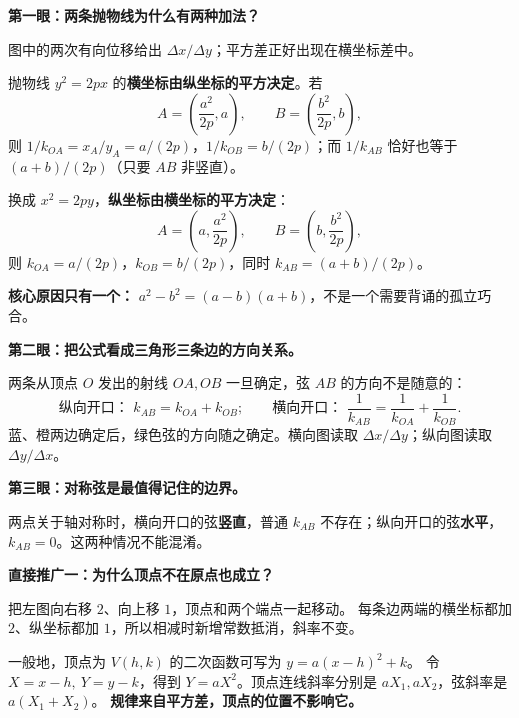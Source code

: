 \clearpage
\begin{explanationbox}
\textbf{第一眼：两条抛物线为什么有两种加法？}
\begin{center}\end{center}
图中的两次有向位移给出 $\Delta x/\Delta y$；平方差正好出现在横坐标差中。

抛物线 $y^2=2px$ 的\textbf{横坐标由纵坐标的平方决定}。若
\[
A=\left(\frac{a^2}{2p},a\right),\qquad
B=\left(\frac{b^2}{2p},b\right),
\]
则 $1/k_{OA}=x_A/y_A=a/(2p)$，$1/k_{OB}=b/(2p)$；而 $1/k_{AB}$ 恰好也等于 $(a+b)/(2p)$（只要 $AB$ 非竖直）。

换成 $x^2=2py$，\textbf{纵坐标由横坐标的平方决定}：
\[
A=\left(a,\frac{a^2}{2p}\right),\qquad
B=\left(b,\frac{b^2}{2p}\right),
\]
则 $k_{OA}=a/(2p)$，$k_{OB}=b/(2p)$，同时 $k_{AB}=(a+b)/(2p)$。

\textbf{核心原因只有一个：} $a^2-b^2=(a-b)(a+b)$，不是一个需要背诵的孤立巧合。

\end{explanationbox}
\clearpage
\begin{explanationbox}
\textbf{第二眼：把公式看成三角形三条边的方向关系。}
\begin{center}\end{center}

两条从顶点 $O$ 发出的射线 $OA,OB$ 一旦确定，弦 $AB$ 的方向不是随意的：
\[
\text{纵向开口： }k_{AB}=k_{OA}+k_{OB};
\qquad
\text{横向开口： }\frac1{k_{AB}}=\frac1{k_{OA}}+\frac1{k_{OB}}.
\]
蓝、橙两边确定后，绿色弦的方向随之确定。横向图读取 $\Delta x/\Delta y$；纵向图读取 $\Delta y/\Delta x$。

\end{explanationbox}
\clearpage
\begin{explanationbox}
\textbf{第三眼：对称弦是最值得记住的边界。}
\begin{center}

\end{center}
两点关于轴对称时，横向开口的弦\textbf{竖直}，普通 $k_{AB}$ 不存在；纵向开口的弦\textbf{水平}，$k_{AB}=0$。这两种情况不能混淆。
\end{explanationbox}

\clearpage
\begin{explanationbox}
\textbf{直接推广一：为什么顶点不在原点也成立？}
\begin{center}\end{center}
把左图向右移 $2$、向上移 $1$，顶点和两个端点一起移动。
每条边两端的横坐标都加 $2$、纵坐标都加 $1$，所以相减时新增常数抵消，斜率不变。

一般地，顶点为 $V(h,k)$ 的二次函数可写为 $y=a(x-h)^2+k$。
令 $X=x-h,\ Y=y-k$，得到 $Y=aX^2$。顶点连线斜率分别是 $aX_1,aX_2$，弦斜率是 $a(X_1+X_2)$。
\textbf{规律来自平方差，顶点的位置不影响它。}
\end{explanationbox}

